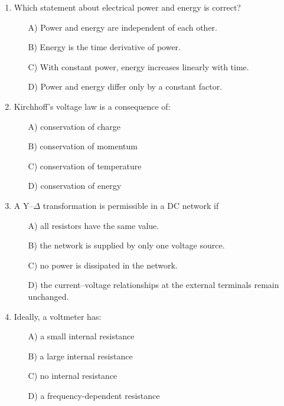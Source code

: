 \documentclass[a4paper,12pt]{article}
\newif\ifshowsolutions
\begin{document}
\begin{enumerate}[label=\textbf{\arabic*.}, leftmargin=*, itemsep=8pt]
  \item Which statement about electrical power and energy is correct?
    \begin{itemize}[label=$\square$]
      \item[A)] Power and energy are independent of each other.
      \item[B)] Energy is the time derivative of power.
      \item[C)] With constant power, energy increases linearly with time.
      \item[D)] Power and energy differ only by a constant factor.
    \end{itemize}

\ifshowsolutions
Solution: C
\fi

  \item Kirchhoff’s voltage law is a consequence of:
    \begin{itemize}[label=$\square$]
      \item[A)] conservation of charge
      \item[B)] conservation of momentum
      \item[C)] conservation of temperature
      \item[D)] conservation of energy
    \end{itemize}

\ifshowsolutions
Solution: D
\fi

  \item A Y–$\Delta$ transformation is permissible in a DC network if
    \begin{itemize}[label=$\square$]
      \item[A)] all resistors have the same value.
      \item[B)] the network is supplied by only one voltage source.
      \item[C)] no power is dissipated in the network.
      \item[D)] the current–voltage relationships at the external terminals remain unchanged.
    \end{itemize}

\ifshowsolutions
Solution: D
\fi

  \item Ideally, a voltmeter has:
    \begin{itemize}[label=$\square$]
      \item[A)] a small internal resistance
      \item[B)] a large internal resistance
      \item[C)] no internal resistance
      \item[D)] a frequency-dependent resistance
    \end{itemize}


\end{enumerate}
\end{document}
